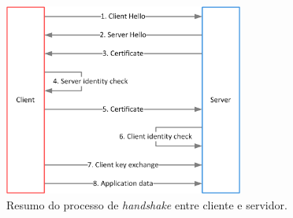 \begin{figure}[h]
    \centering
    \includegraphics[width=0.7\textwidth]{img/ssl/handshake.png}
    \caption{Resumo do processo de \emph{handshake} entre cliente e servidor.}
\end{figure}

